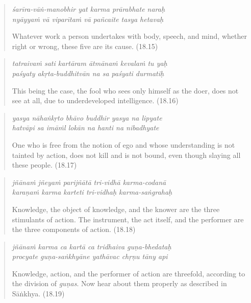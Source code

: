 \documentclass[12pt, twoside, openright]{memoir}
\begin{document}
\par
\begin{verse}
\textit{śarīra-vāṅ-manobhir yat karma prārabhate naraḥ} \\
\textit{nyāyyaṁ vā viparītaṁ vā pañcaite tasya hetavaḥ}

\noindent Whatever work a person undertakes with body, speech, and mind, whether right or wrong, these five are its cause. (18.15)
\end{verse}
\par



\par
\begin{verse}
\textit{tatraivaṁ sati kartāram ātmānaṁ kevalaṁ tu yaḥ} \\
\textit{paśyaty akṛta-buddhitvān na sa paśyati durmatiḥ}

\noindent This being the case, the fool who sees only himself as the doer, does not see at all, due to underdeveloped intelligence. (18.16)
\end{verse}
\par



\par
\begin{verse}
\textit{yasya nāhaṅkṛto bhāvo buddhir yasya na lipyate} \\
\textit{hatvāpi sa imāṁl lokān na hanti na nibadhyate}

\noindent One who is free from the notion of ego and whose understanding is not tainted by action, does not kill and is not bound, even though slaying all these people. (18.17)
\end{verse}
\par



\par
\begin{verse}
\textit{jñānaṁ jñeyaṁ parijñātā tri-vidhā karma-codanā} \\
\textit{karaṇaṁ karma karteti tri-vidhaḥ karma-saṅgrahaḥ}

\noindent Knowledge, the object of knowledge, and the knower are the three stimulants of action. The instrument, the act itself, and the performer are the three components of action. (18.18)
\end{verse}
\par



\par
\begin{verse}
\textit{jñānaṁ karma ca kartā ca tridhaiva guṇa-bhedataḥ} \\
\textit{procyate guṇa-saṅkhyāne yathāvac chṛṇu tāny api}

\noindent Knowledge, action, and the performer of action are threefold, according to the division of \textit{guṇas}. Now hear about them properly as described in Sāṅkhya. (18.19)
\end{verse}
\par
\end{document}
